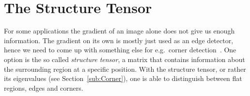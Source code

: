 \section{The Structure Tensor}\label{sec:Structure}
For some applications the gradient of an image alone does not give us enough information. The
gradient on its own is mostly just used as an edge detector, hence we need to come up with
something else for e.g.\ corner detection~\cite{ipcv}. One option is the so called \textit{structure tensor}, a
matrix that contains information about the surrounding region at a specific position. With the
structure tensor, or rather its eigenvalues (see Section~\ref{sub:Corner}), one is able to
distinguish between flat regions, edges and corners.

